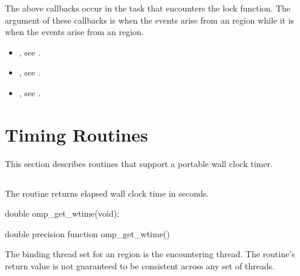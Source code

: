 The above callbacks occur in the task that encounters the lock function.  
The  argument of these callbacks is  when
the events arise from an  region while it is 
 when the events arise from an 
 region.

\crossreferences
\begin{itemize}
\item {}, see
.

\item {}, see
.

\item {}, see
.
\end{itemize}



\section{Timing Routines}
\label{sec:Timing Routines}
This section describes routines that support a portable wall clock timer.



\subsection{}
\label{subsec:omp_get_wtime}
\summary
The  routine returns elapsed wall clock time in seconds.

\format
\begin{ccppspecific}
\begin{ompcFunction}
double omp_get_wtime(void);
\end{ompcFunction}
\end{ccppspecific}

\begin{fortranspecific}
\begin{ompfFunction}
double precision function omp_get_wtime()
\end{ompfFunction}
\end{fortranspecific}

\binding
The binding thread set for an  region is the 
encountering thread. The routine's return value is not guaranteed 
to be consistent across any set of threads.

